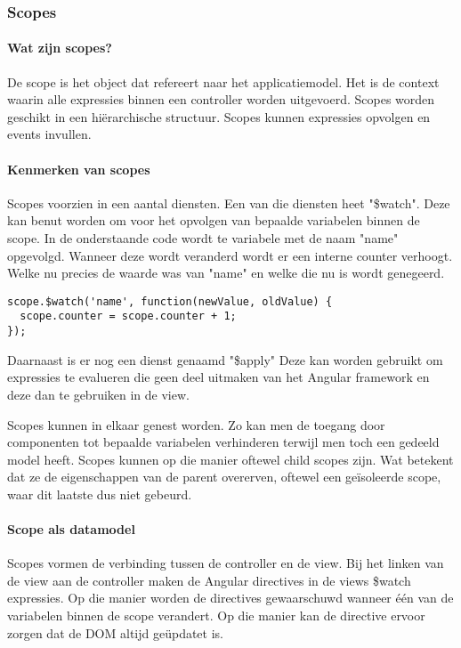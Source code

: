 \documentclass[a4paper,11pt]{article}
\begin{document}
\subsubsection{Scopes}
\paragraph{Wat zijn scopes?}
De scope is het object dat refereert naar het applicatiemodel. Het is de context waarin alle expressies binnen een controller worden uitgevoerd. Scopes worden geschikt in een hiërarchische structuur. Scopes kunnen expressies opvolgen en events invullen.\cite{angular:scopes}

\paragraph{Kenmerken van scopes}
Scopes voorzien in een aantal diensten. Een van die diensten heet "\$watch". Deze kan benut worden om voor het opvolgen van bepaalde variabelen binnen de scope. In de onderstaande code wordt te variabele met de naam "name" opgevolgd. Wanneer deze wordt veranderd wordt er een interne counter verhoogt. Welke nu precies de waarde was van "name" en welke die nu is wordt genegeerd.
\begin{lstlisting}
scope.$watch('name', function(newValue, oldValue) {
  scope.counter = scope.counter + 1;
});
\end{lstlisting}

Daarnaast is er nog een dienst genaamd "\$apply" Deze kan worden gebruikt om expressies te evalueren die geen deel uitmaken van het Angular framework en deze dan te gebruiken in de view.

Scopes kunnen in elkaar genest worden. Zo kan men de toegang door componenten tot bepaalde variabelen verhinderen terwijl men toch een gedeeld model heeft. Scopes kunnen op die manier oftewel child scopes zijn. Wat betekent dat ze de eigenschappen van de parent overerven, oftewel een geïsoleerde scope, waar dit laatste dus niet gebeurd.

\paragraph{Scope als datamodel}
Scopes vormen de verbinding tussen de controller en de view. Bij het linken van de view aan de controller maken de Angular directives in de views \$watch expressies. Op die manier worden de directives gewaarschuwd wanneer één van de variabelen binnen de scope verandert. Op die manier kan de directive ervoor zorgen dat de DOM altijd geüpdatet is.
\end{document}
